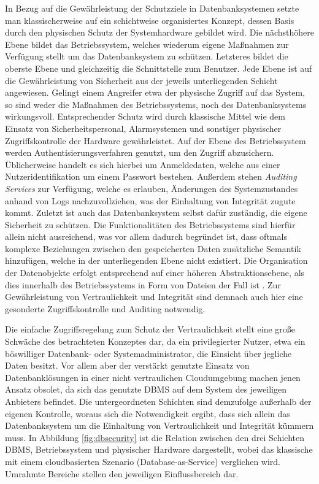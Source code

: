 In Bezug auf die Gewährleistung der Schutzziele in Datenbanksystemen setzte man klassischerweise auf ein schichtweise organisiertes Konzept, dessen Basis durch den physischen Schutz der Systemhardware gebildet wird. Die nächsthöhere Ebene bildet das Betriebssystem, welches wiederum eigene Maßnahmen zur Verfügung stellt um das Datenbanksystem zu schützen. Letzteres bildet die oberste Ebene und gleichzeitig die Schnittstelle zum Benutzer. Jede Ebene ist auf die Gewährleistung von Sicherheit aus der jeweils unterliegenden Schicht angewiesen. Gelingt einem Angreifer etwa der physische Zugriff auf das System, so sind weder die Maßnahmen des Betriebssystems, noch des Datenbanksystems wirkungsvoll. Entsprechender Schutz wird durch klassische Mittel wie dem Einsatz von Sicherheitspersonal, Alarmsystemen und sonstiger physischer Zugriffskontrolle der Hardware gewährleistet. Auf der Ebene des Betriebssystem werden Authentisierungsverfahren genutzt, um den Zugriff abzusichern. Üblicherweise handelt es sich hierbei um Anmeldedaten, welche aus einer Nutzeridentifikation um einem Passwort bestehen. Außerdem stehen \textit{Auditing Services} zur Verfügung, welche es erlauben, Änderungen des Systemzustandes anhand von Logs nachzuvollziehen, was der Einhaltung von Integrität zugute kommt. Zuletzt ist auch das Datenbanksystem selbst dafür zuständig, die eigene Sicherheit zu schützen. Die Funktionalitäten des Betriebssystems sind hierfür allein nicht ausreichend, was vor allem dadurch begründet ist, dass oftmals komplexe Beziehungen zwischen den gespeicherten Daten zusätzliche Semantik hinzufügen, welche in der unterliegenden Ebene nicht existiert. Die Organisation der Datenobjekte erfolgt entsprechend auf einer höheren Abstraktionsebene, als dies innerhalb des Betriebssystems in Form von Dateien der Fall ist \cite{Vimercati2001}. Zur Gewährleistung von Vertraulichkeit und Integrität sind demnach auch hier eine gesonderte Zugriffskontrolle und Auditing notwendig.

Die einfache Zugriffsregelung zum Schutz der Vertraulichkeit stellt eine große Schwäche des betrachteten Konzeptes dar, da ein privilegierter Nutzer, etwa ein böswilliger Datenbank- oder Systemadministrator, die Einsicht über jegliche Daten besitzt. Vor allem aber der verstärkt genutzte Einsatz von Datenbanklösungen in einer nicht vertraulichen Cloudumgebung machen jenen Ansatz obsolet, da sich das genutzte \ac{DBMS} auf dem System des jeweiligen Anbieters befindet. Die untergeordneten Schichten sind demzufolge außerhalb der eigenen Kontrolle, woraus sich die Notwendigkeit ergibt, dass sich allein das Datenbanksystem um die Einhaltung von Vertraulichkeit und Integrität kümmern muss. In Abbildung \ref{fig:dbsecurity} ist die Relation zwischen den drei Schichten \ac{DBMS}, Betriebssystem und physischer Hardware dargestellt, wobei das klassische mit einem cloudbasierten Szenario (Database-as-Service) verglichen wird. Umrahmte Bereiche stellen den jeweiligen Einflussbereich dar.

